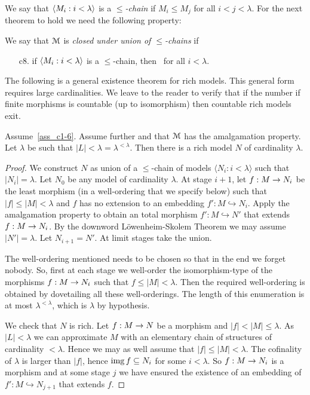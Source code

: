 \documentclass[creche.tex]{subfiles}
\begin{document}
We say that $\langle M_i:i<\lambda\rangle$ is a \emph{$\le$-chain\/} if $M_i\le M_j$ for all $i<j<\lambda$.
For the next theorem to hold we need the following property:

\begin{definition}
We say that $\EuScript M$ is \emph{closed under union of $\le$-chains\/} if
\begin{itemize}
\item[c8.] if $\langle M_i:i<\lambda\rangle$ is a $\le$-chain,  then  \ for all $i<\lambda$.\QED
\end{itemize}
\end{definition}

The following is a general existence theorem for rich models.
This general form requires large cardinalities.
We leave to the reader to verify that if the number if finite morphisms is countable (up to isomorphism) then countable rich models exit.

\begin{theorem}  Assume~\ref{ass_c1-6}.
Assume further  and that $\EuScript M$ has the amalgamation property.
Let $\lambda$ be such that $|L|<\lambda=\lambda^{<\lambda}$.
Then there is a rich model $N$ of cardinality $\lambda$.
\end{theorem}

\begin{proof} We construct $N$ as union of a $\le$-chain of models $\langle N_i:i < \lambda\rangle$ such that $|N_i| = \lambda$.
Let $N_0$ be any model of cardinality $\lambda$.
At stage $i+1$, let $f:M\rightarrow N_i$ be the least morphism (in a well-ordering that we specify below) such that $|f|\le|M|<\lambda$ and $f$ has no extension to an embedding $f':M\hookrightarrow N_i$.
Apply the amalgamation property to obtain an total morphism $f':M\hookrightarrow N'$ that extends $f:M\rightarrow N_i$.
By the downword L\"owenheim-Skolem Theorem we may assume $|N'|=\lambda$.
Let $N_{i+1}=N'$.
At limit stages take the union.

The well-ordering mentioned needs to be chosen so that in the end we forget nobody.
So, first at each stage we well-order the isomorphism-type of the morphisms $f:M\rightarrow N_i$ such that  $f\le|M|<\lambda$.
Then the required well-ordering is obtained by dovetailing all these well-orderings.
The length of this enumeration is at most $\lambda^{<\lambda}$, which is $\lambda$ by hypothesis.

We check that $N$ is rich.
Let $f:M\rightarrow N$ be a morphism and $|f|<|M|\le\lambda$.
As $|L|<\lambda$ we can approximate $M$ with an elementary chain of structures of cardinality $<\lambda$.
Hence we may as well assume that $|f|\le|M|<\lambda$.
The cofinality of $\lambda$ is larger than $|f|$, hence $\mathop{\rm img} f\subseteq N_i$ for some $i<\lambda$.
So $f:M\rightarrow N_i$ is a morphism and at some stage $j$ we have ensured the existence of an embedding of $f':M\hookrightarrow N_{j+1}$ that extends $f$.
\end{proof}
\end{document}
